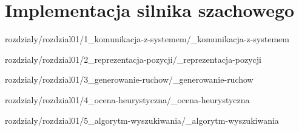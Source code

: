 \chapter {Implementacja silnika szachowego}
\label {ch: implementacja-silnika-szachowego}

 {rozdzialy/rozdzial01/1_komunikacja-z-systemem/_komunikacja-z-systemem}

 {rozdzialy/rozdzial01/2_reprezentacja-pozycji/_reprezentacja-pozycji}

 {rozdzialy/rozdzial01/3_generowanie-ruchow/_generowanie-ruchow}

 {rozdzialy/rozdzial01/4_ocena-heurystyczna/_ocena-heurystyczna}

 {rozdzialy/rozdzial01/5_algorytm-wyszukiwania/_algorytm-wyszukiwania}


